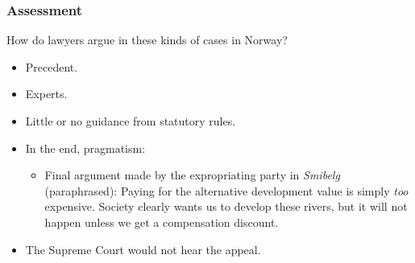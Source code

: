 \documentclass{beamer}
\begin{document}
\begin{frame}\frametitle{Assessment}
How do lawyers argue in these kinds of cases in Norway? 
\begin{itemize}
\item Precedent.
\item Experts.
\item Little or no guidance from statutory rules.
\item In the end, pragmatism:
\begin{itemize}
\item Final argument made by the expropriating party in {\it Smibelg} (paraphrased): Paying for the alternative development value is simply {\it too} expensive. Society clearly wants us to develop these rivers, but it will not happen unless we get a compensation discount.
\end{itemize}
\item The Supreme Court would not hear the appeal.
\end{itemize}
\end{frame}
\end{document}
